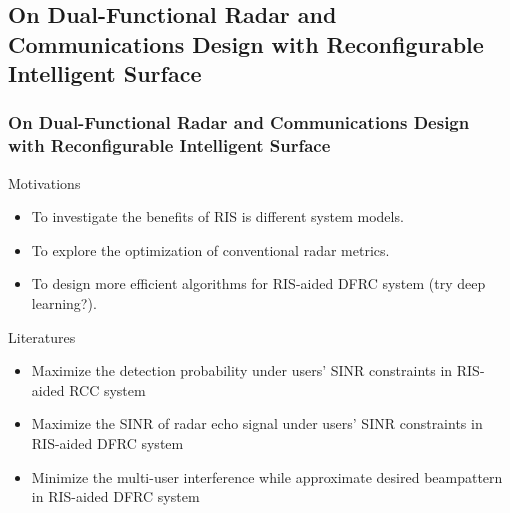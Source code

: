 \subsection{On Dual-Functional Radar and Communications Design with Reconfigurable Intelligent Surface}
\begin{frame}
    \frametitle{On Dual-Functional Radar and Communications Design with Reconfigurable Intelligent Surface}
    \begin{block}{Motivations}
        \begin{itemize}
        \small
        \item To investigate the benefits of RIS is different system models.
        \item To explore the optimization of conventional radar metrics.
        \item To design more efficient algorithms for RIS-aided DFRC system (try deep learning?). 
        \end{itemize}    
    \end{block}

    \begin{block}{Literatures}
        \begin{itemize}
        \small
        \item Maximize the detection probability under users' SINR constraints in RIS-aided RCC system \cite{wang2020ris}
        \item Maximize the SINR of radar echo signal under users' SINR constraints in RIS-aided DFRC system \cite{jiang2021dfrc}
        \item Minimize the multi-user interference while approximate desired beampattern in RIS-aided DFRC system \cite{wang2021joint}
        \end{itemize}    
    \end{block}
\end{frame}

